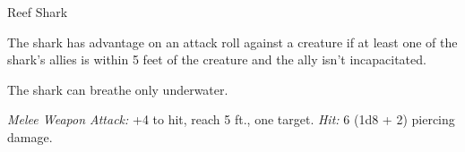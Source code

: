 \documentclass[10pt,a4paper,twoside,bg=none,twocolumn,openany,nodeprecatedcode]{dndbook}
\begin{document}
\begin{DndMonster}[float=t]{Reef Shark}
\DndMonsterBasics[
armor-class = {12 (natural armor)},
hit-points = {\DndDice{4d8 + 4}},
speed = {0 ft., swim 40 ft.}
]
\DndMonsterAbilityScores[
 str = 14,
 dex = 13,
 con = 13,
 int = 1,
 wis = 10,
 cha = 4
]
\DndMonsterDetails[
skills = {Perception +2},
senses = {blindsight 30 ft., passive perception 12},
challenge = 1/2,
]
The shark has advantage on an attack roll against a creature if at least one of the shark's allies is within 5 feet of the creature and the ally isn't incapacitated.

The shark can breathe only underwater.

\par
{}
\textsl{Melee Weapon Attack:} +4 to hit, reach 5 ft., one target. \textsl{Hit:} 6 (1d8 + 2) piercing damage.

\end{DndMonster}
\end{document}
